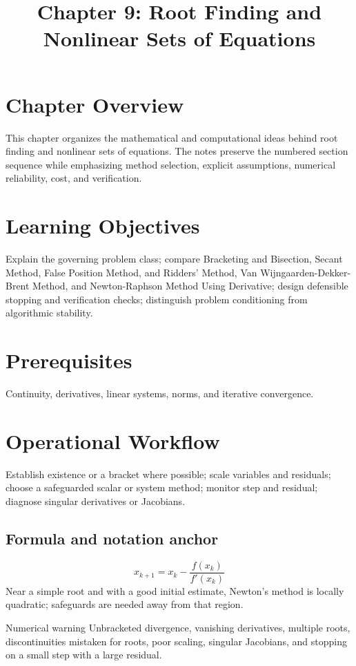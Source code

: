 \documentclass[10pt,letterpaper]{article}
\title{Chapter 9: Root Finding and Nonlinear Sets of Equations}
\author{}
\date{}
\begin{document}
\maketitle

\section*{Chapter Overview}
This chapter organizes the mathematical and computational ideas behind root finding and nonlinear sets of equations. The notes preserve the numbered section sequence while emphasizing method selection, explicit assumptions, numerical reliability, cost, and verification.

\section*{Learning Objectives}
Explain the governing problem class; compare Bracketing and Bisection, Secant Method, False Position Method, and Ridders' Method, Van Wijngaarden-Dekker-Brent Method, and Newton-Raphson Method Using Derivative; design defensible stopping and verification checks; distinguish problem conditioning from algorithmic stability.

\section*{Prerequisites}
Continuity, derivatives, linear systems, norms, and iterative convergence.

\section*{Operational Workflow}
Establish existence or a bracket where possible; scale variables and residuals; choose a safeguarded scalar or system method; monitor step and residual; diagnose singular derivatives or Jacobians.

\subsection*{Formula and notation anchor}
\[
x_{k+1}=x_k-\frac{f(x_k)}{f'(x_k)}
\]
Near a simple root and with a good initial estimate, Newton's method is locally quadratic; safeguards are needed away from that region.

\begin{warnbox}{Numerical warning}
Unbracketed divergence, vanishing derivatives, multiple roots, discontinuities mistaken for roots, poor scaling, singular Jacobians, and stopping on a small step with a large residual.
\end{warnbox}
\end{document}
